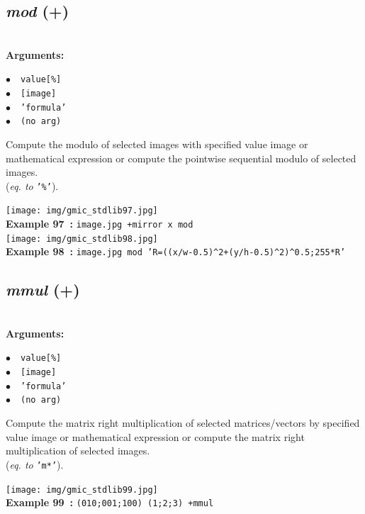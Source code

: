 \documentclass[a4paper,10.5pt,twoside]{book}
\def\comma{\discretionary{,}{}{,}}
\newcommand{\Cb}[1]{\textcolor{cb}{#1}}
\begin{document}
\subsection{\emph{mod} (+)}\vspace*{-0.7em}
~\\\textbf{\Cb{Arguments: }}\begin{flushleft}
{\small \Cb{\hspace*{0.5cm}$\bullet$~~\texttt{value[\%]}}}~~~\\
{\small \Cb{\hspace*{0.5cm}$\bullet$~~\texttt{[image]}}}~~~\\
{\small \Cb{\hspace*{0.5cm}$\bullet$~~\texttt{'formula'}}}~~~\\
{\small \Cb{\hspace*{0.5cm}$\bullet$~~\texttt{(no arg)}}}\end{flushleft}
Compute the modulo of selected images with specified value{\comma} image or mathematical
expression{\comma} or compute the pointwise sequential modulo of selected images.
~\\(\emph{eq. to} {\small \texttt{'\%'}}).
\begin{center}\texttt{[image: img/gmic\_stdlib97.jpg]}\\
{\footnotesize \textbf{Example 97~:} \texttt{image.jpg +mirror x mod}}
\\\texttt{[image: img/gmic\_stdlib98.jpg]}\\
{\footnotesize \textbf{Example 98~:} \texttt{image.jpg mod 'R=((x/w-0.5)\textasciicircum 2+(y/h-0.5)\textasciicircum 2)\textasciicircum 0.5;255*R'}}
\end{center}

\subsection{\emph{mmul} (+)}\vspace*{-0.7em}
~\\\textbf{\Cb{Arguments: }}\begin{flushleft}
{\small \Cb{\hspace*{0.5cm}$\bullet$~~\texttt{value[\%]}}}~~~\\
{\small \Cb{\hspace*{0.5cm}$\bullet$~~\texttt{[image]}}}~~~\\
{\small \Cb{\hspace*{0.5cm}$\bullet$~~\texttt{'formula'}}}~~~\\
{\small \Cb{\hspace*{0.5cm}$\bullet$~~\texttt{(no arg)}}}\end{flushleft}
Compute the matrix right multiplication of selected matrices/vectors by specified value{\comma} image or
mathematical expression{\comma} or compute the matrix right multiplication of selected images.
~\\(\emph{eq. to} {\small \texttt{'m*'}}).
\begin{center}\texttt{[image: img/gmic\_stdlib99.jpg]}\\
{\footnotesize \textbf{Example 99~:} \texttt{(0{\comma}1{\comma}0;0{\comma}0{\comma}1;1{\comma}0{\comma}0) (1;2;3) +mmul}}
\end{center}
\end{document}
